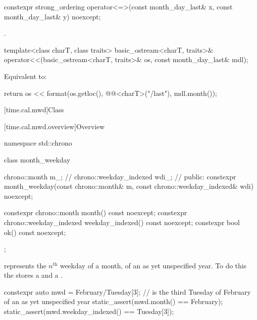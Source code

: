 %
\begin{itemdecl}
constexpr strong_ordering operator<=>(const month_day_last& x, const month_day_last& y) noexcept;
\end{itemdecl}

\begin{itemdescr}
\pnum
\returns
{}.
\end{itemdescr}

%
\begin{itemdecl}
template<class charT, class traits>
  basic_ostream<charT, traits>&
    operator<<(basic_ostream<charT, traits>& os, const month_day_last& mdl);
\end{itemdecl}

\begin{itemdescr}
\pnum
\effects
Equivalent to:
\begin{codeblock}
return os << format(os.getloc(), @@<charT>("{}/last"), mdl.month());
\end{codeblock}
\end{itemdescr}

[time.cal.mwd]{Class }

[time.cal.mwd.overview]{Overview}

\begin{codeblock}
namespace std::chrono {
  class month_weekday {
    chrono::month           m_;         // \expos
    chrono::weekday_indexed wdi_;       // \expos
  public:
    constexpr month_weekday(const chrono::month& m, const chrono::weekday_indexed& wdi) noexcept;

    constexpr chrono::month           month()           const noexcept;
    constexpr chrono::weekday_indexed weekday_indexed() const noexcept;
    constexpr bool ok() const noexcept;
  };
}
\end{codeblock}

\pnum
{} represents the $n^\text{th}$ weekday of a month,
of an as yet unspecified year.
To do this the  stores a  and a .

\pnum
\begin{example}
\begin{codeblock}
constexpr auto mwd
    = February/Tuesday[3];              //  is the third Tuesday of February of an as yet unspecified year
static_assert(mwd.month() == February);
static_assert(mwd.weekday_indexed() == Tuesday[3]);
\end{codeblock}
\end{example}

